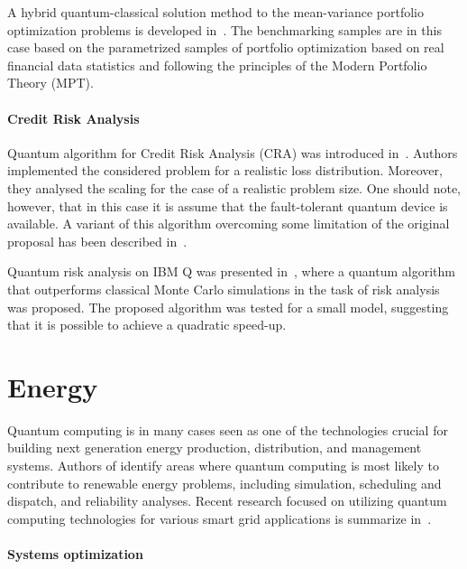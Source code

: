 \documentclass[a4paper,11pt]{article}
\begin{document}
A hybrid quantum-classical solution method to the mean-variance portfolio optimization problems is developed in~\cite{venturelli2019reverse}. The benchmarking samples are in this case based on the parametrized samples of portfolio optimization based on real financial data statistics and following the principles of the Modern Portfolio Theory (MPT).

\paragraph{Credit Risk Analysis}
Quantum algorithm for Credit Risk Analysis (CRA) was introduced in~\cite{egger2021credit}. Authors implemented the considered problem for a realistic loss distribution. Moreover, they analysed the scaling  for the case of a realistic problem size. One should note, however, that in this case it is assume that the fault-tolerant quantum device is available. A variant of this algorithm overcoming some limitation of the original proposal has been described in~\cite{dri2022towards,dri2023more}.


Quantum risk analysis on IBM Q was presented in~\cite{woerner2019quantum}, where a quantum algorithm that outperforms classical Monte Carlo simulations in the task of risk analysis was proposed.  The proposed algorithm was
tested for a small model, suggesting that it is possible to achieve a quadratic speed-up.


\section{Energy}

Quantum computing is in many cases seen as one of the technologies crucial for building next generation energy production, distribution, and management systems. Authors of \cite{giani2021quantum} identify areas where quantum computing is most likely to contribute to renewable energy problems, including simulation, scheduling and dispatch, and reliability analyses. Recent research focused on utilizing quantum computing technologies for various smart grid applications is summarize in~\cite{ullah2022quantum}.


\paragraph{Systems optimization}
\end{document}
